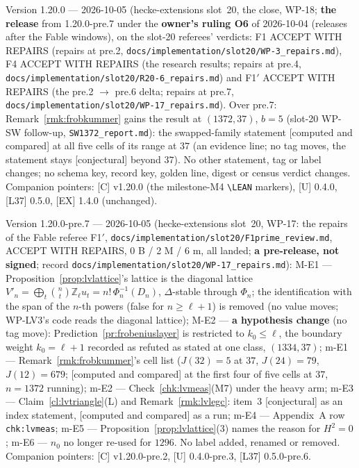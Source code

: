 \documentclass[11pt]{article}
\theoremstyle{remark}
\newcommand{\Z}{\mathbb{Z}}
\newcommand{\De}{\Delta}
\newcommand{\Dn}{D_n}
\newcommand{\CONJ}{\textsf{[conjectural]}}
\newcommand{\CMPD}{\textsf{[computed and compared]}}   %
\begin{document}
Version 1.20.0 --- 2026-10-05 (hecke-extensions slot~20, the close, WP-18; \textbf{the release} from 1.20.0-pre.7 under the \textbf{owner's ruling O6} of 2026-10-04
(releases after the Fable windows), on the slot-20 referees' verdicts: F1 ACCEPT WITH REPAIRS (repairs at pre.2, \texttt{docs/implementation/slot20/WP-3\_repairs.md}),
F4 ACCEPT WITH REPAIRS (the research results; repairs at pre.4, \texttt{docs/implementation/slot20/R20-6\_repairs.md}) and F1$'$ ACCEPT WITH REPAIRS (the pre.2 $\to$ pre.6 delta;
repairs at pre.7, \texttt{docs/implementation/slot20/WP-17\_repairs.md}). Over pre.7: Remark~\ref{rmk:frobkummer} gains the result at $(1372,37)$, $b=5$ (slot-20 WP-SW follow-up, \texttt{SW1372\_report.md}): the
swapped-family statement \CMPD{} at all five cells of its range at $37$ (an evidence line; no tag moves, the statement stays \CONJ{} beyond $37$). No other statement,
tag or label changes; no schema key, record key, golden line, digest or census verdict changes. Companion pointers: [C] v1.20.0 (the milestone-M4
\texttt{\textbackslash LEAN} markers), [U] 0.4.0, [L37] 0.5.0, [EX] 1.4.0 (unchanged).

Version 1.20.0-pre.7 --- 2026-10-05 (hecke-extensions slot~20, WP-17: the repairs of the Fable referee F1$'$, \texttt{docs/implementation/slot20/F1prime\_review.md},
ACCEPT WITH REPAIRS, 0 B / 2 M / 6 m, all landed; \textbf{a pre-release, not signed}; record \texttt{docs/implementation/slot20/WP-17\_repairs.md}): M-E1 --- Proposition~\ref{prop:lvlattice}'s
lattice is the diagonal lattice $V'_n=\bigoplus_t\binom nt\Z_\ell u_t=n!\,\Phi_n^{-1}(\Dn)$, $\De$-stable through $\Phi_n$; the identification with the span of the $n$-th powers (false for
$n\ge\ell+1$) is removed (no value moves; WP-LV3's code reads the diagonal lattice); M-E2 --- \textbf{a hypothesis change} (no tag move): Prediction~\ref{pr:frobeniuslayer} is restricted to
$k_0\le\ell$, the boundary weight $k_0=\ell+1$ recorded as refuted as stated at one class, $(1334,37)$; m-E1 --- Remark~\ref{rmk:frobkummer}'s cell list ($J(32)=5$ at $37$, $J(24)=79$, $J(12)=679$;
\CMPD{} at the first four of five cells at $37$, $n=1372$ running); m-E2 --- Check~\ref{chk:lvmeas}(M7) under the heavy arm; m-E3 --- Claim~\ref{cl:lvtriangle}(L) and Remark~\ref{rmk:lvlegc}:
item~3 \CONJ{} as an index statement, \CMPD{} as a run; m-E4 --- Appendix~A row \texttt{chk:lvmeas}; m-E5 --- Proposition~\ref{prop:lvlattice}(3) names the reason for $H^{2}=0$;
m-E6 --- $n_0$ no longer re-used for $1296$. No label added, renamed or removed. Companion pointers: [C] v1.20.0-pre.2, [U] 0.4.0-pre.3, [L37] 0.5.0-pre.6.
\end{document}
